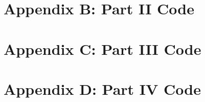 \documentclass{article}
\begin{document}
\section*{Appendix B: Part II Code}


\section*{Appendix C: Part III Code}


\section*{Appendix D: Part IV Code}

\end{document}
